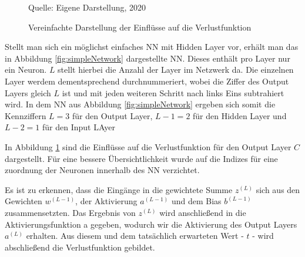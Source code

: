 \begin{figure}[t]
    \centering
    \caption[]{Vereinfachte Darstellung der Einflüsse auf die Verlustfunktion}
    \label{fig:unfoldedCost}
    Quelle: Eigene Darstellung, 2020
\end{figure}

Stellt man sich ein möglichst einfaches \ac{NN} mit Hidden Layer vor, erhält man das in Abbildung \ref{fig:simpleNetwork} dargestellte \ac{NN}. Dieses enthält pro Layer nur ein Neuron. $L$ stellt hierbei die Anzahl der Layer im Netzwerk da. Die einzelnen Layer werdem dementsprechend durchnummeriert, wobei die Ziffer des Output Layers gleich $L$ ist und mit jeden weiteren Schritt nach links Eins subtrahiert wird. In dem \ac{NN} aus Abbildung \ref{fig:simpleNetwork} ergeben sich somit die Kennziffern $L = 3$ für den Output Layer, $L-1 = 2 $ für den Hidden Layer und $L-2 = 1 $ für den Input LAyer

In Abbildung \ref{fig:unfoldedCost} sind die Einflüsse auf die Verlustfunktion für den Output Layer $C$ dargestellt.  Für eine bessere Übersichtlichkeit wurde auf die Indizes für eine zuordnung der Neuronen innerhalb des \ac{NN} verzichtet.

Es ist zu erkennen, dass die Eingänge in die gewichtete Summe $z^{(L)}$ sich aus den Gewichten $w^{(L-1)}$, der Aktivierung $a^{(L-1)}$ und dem Bias $b^{(L-1)}$ zusammensetzten. Das Ergebnis von $z^{(L)}$ wird anschließend in die Aktivierungsfunktion a gegeben, wodurch wir die Aktivierung des Output Layers $a^{(L)}$ erhalten. Aus diesem und dem tatsächlich erwarteten Wert - $t$ - wird abschließend die Verlustfunktion gebildet. 
